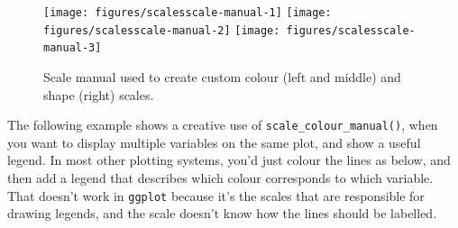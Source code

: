 \begin{Shaded}
\begin{Highlighting}[]
\StringTok{ }  \NormalTok{)}
\StringTok{ }\NormalTok{(} \StringTok{ }
\StringTok{  }\NormalTok{(} \NormalTok{(}\NormalTok{, }\NormalTok{, }\NormalTok{, }\NormalTok{))}
\StringTok{ }\NormalTok{(} \NormalTok{, } \NormalTok{, } \NormalTok{, } \NormalTok{)}
\StringTok{ }\NormalTok{(} \StringTok{ }\NormalTok{(} 
\StringTok{ }\NormalTok{(} \StringTok{ }
\StringTok{  }\NormalTok{(} \NormalTok{(}\NormalTok{, }\NormalTok{, }\NormalTok{, }\NormalTok{))}
\end{Highlighting}
\end{Shaded}

\begin{figure}

{\centering \texttt{[image: figures/scalesscale-manual-1]} \texttt{[image: figures/scalesscale-manual-2]} \texttt{[image: figures/scalesscale-manual-3]} 

}

\caption{Scale manual used to create custom colour (left and middle) and shape (right) scales.\label{fig:scale-manual}}
\end{figure}

The following example shows a creative use of
\texttt{scale\_colour\_manual()}, when you want to display multiple
variables on the same plot, and show a useful legend. In most other
plotting systems, you'd just colour the lines as below, and then add a
legend that describes which colour corresponds to which variable. That
doesn't work in \texttt{ggplot} because it's the scales that are
responsible for drawing legends, and the scale doesn't know how the
lines should be labelled.


